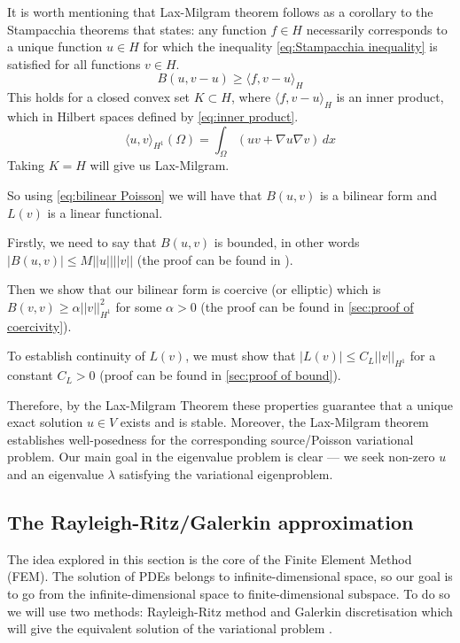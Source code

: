 \documentclass[conference]{IEEEtran}
\begin{document}
It is worth mentioning that Lax-Milgram theorem follows as a corollary to the Stampacchia theorems that states: any function $f \in H$ necessarily corresponds to a unique function $u \in H$ for which the inequality \ref{eq:Stampacchia inequality} is satisfied for all functions $v \in H$.
\begin{equation}
    B(u, v - u) \geq \langle f, v - u \rangle_H
    \label{eq:Stampacchia inequality}
\end{equation}
This holds for a closed convex set $K \subset H$, where $\langle f, v - u \rangle_H$ is an inner product, which in Hilbert spaces defined by \ref{eq:inner product}.
\begin{equation}
    \langle u, v \rangle_{H^1}(\Omega) = \int_{\Omega}(uv + \nabla u \nabla v) \, dx
    \label{eq:inner product}
\end{equation}
Taking $K = H$ will give us Lax-Milgram.

So using \ref{eq:bilinear Poisson} we will have that $B(u, v)$ is a bilinear form and $L(v)$ is a linear functional. 

Firstly, we need to say that $B(u, v)$ is bounded, in other words $|B(u, v)| \leq M{||u||}||v||$ (the proof can be found in \cite{b8}).

Then we show that our bilinear form is coercive (or elliptic) which is $B(v, v) \geq \alpha ||v||_{H^1}^2$ for some $\alpha > 0$ (the proof can be found in \ref{sec:proof of coercivity}).

To establish continuity of $L(v)$, we must show that $|L(v)| \leq C_{L}||v||_{H^1}$ for a constant $C_{L} > 0$ (proof can be found in \ref{sec:proof of bound}).

Therefore, by the Lax-Milgram Theorem these properties guarantee that a unique exact solution $u \in V$ exists and is stable. Moreover, the Lax-Milgram theorem establishes well-posedness for the corresponding source/Poisson variational problem. 
Our main goal in the eigenvalue problem is clear --- we seek non-zero $u$ and an eigenvalue $\lambda$ satisfying the variational eigenproblem.


\subsection{The Rayleigh-Ritz/Galerkin approximation}
The idea explored in this section is the core of the Finite Element Method (FEM). The solution of PDEs belongs to infinite-dimensional space, so our goal is to go from the infinite-dimensional space to finite-dimensional subspace. 
To do so we will use two methods: Rayleigh-Ritz method and Galerkin discretisation which will give the equivalent solution of the variational problem \cite{b9}.
\end{document}
